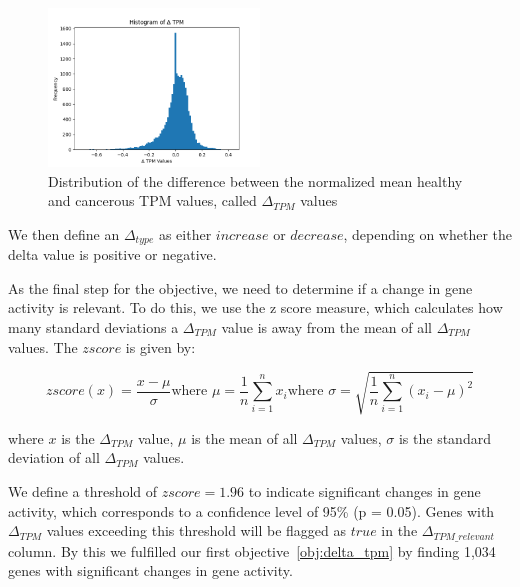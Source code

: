 \begin{figure}[h]
    \centering
    \includegraphics[width=0.5\textwidth]{figures/03_02_delta_tpm}
    \caption{Distribution of the difference between the normalized mean healthy and cancerous TPM values, called $\Delta_{TPM}$ values}
    \label{fig:03_02_delta_tpm}
\end{figure}

We then define an $\Delta_{type}$ as either $increase$ or $decrease$, depending on whether the delta value is positive or negative.

As the final step for the objective, we need to determine if a change in gene activity is relevant.
To do this, we use the z score measure, which calculates how many standard deviations a $\Delta_{TPM}$ value is away
from the mean of all $\Delta_{TPM}$ values.
The $z score$ is given by:

\begin{subequations}
    \begin{equation} \label{eq:z_score}
        z score (x) = \frac{x - {\mu}}{\sigma}
    \end{equation}
    \begin{equation}
        \text{where } \mu = \frac{1}{n} \sum_{i=1}^{n} x_i
        \label{eq:mean}
    \end{equation}
    \begin{equation}
        \text{where } \sigma = \sqrt{\frac{1}{n} \sum_{i=1}^{n} (x_i - \mu)^2}
        \label{eq:std}
    \end{equation}
\end{subequations}

where $x$ is the $\Delta_{TPM}$ value, $\mu$ is the mean of all $\Delta_{TPM}$ values, $\sigma$ is the standard deviation of all $\Delta_{TPM}$ values.

We define a threshold of $z score = 1.96$ to indicate significant changes in gene activity,
which corresponds to a confidence level of 95\% (p = 0.05).
Genes with $\Delta_{TPM}$ values exceeding this threshold will be flagged as $true$ in the $\Delta_{TPM\_relevant}$ column.
By this we fulfilled our first objective~\ref{obj:delta_tpm} by finding 1,034 genes with significant changes in gene activity.

